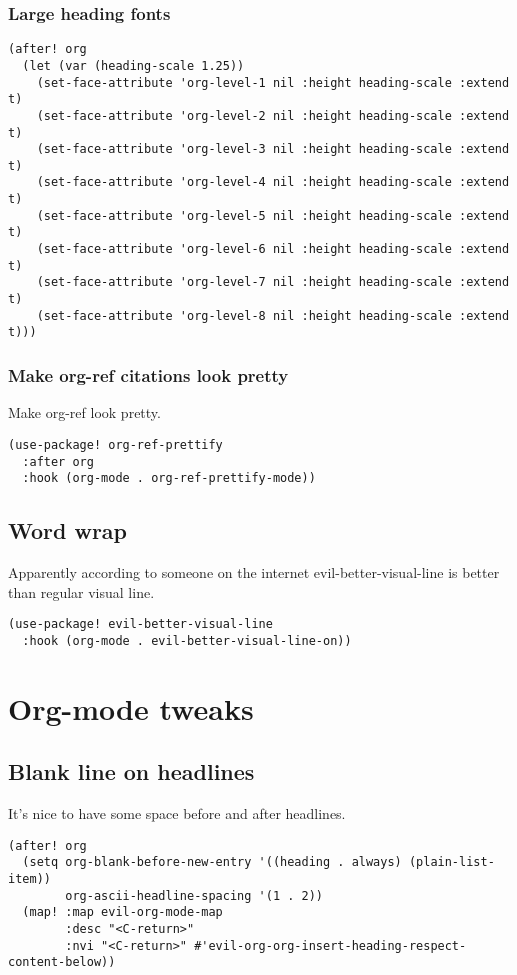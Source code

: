 \documentclass[11pt]{article}
\begin{document}
\subsubsection{Large heading fonts}
\label{sec:org16225b2}
\begin{verbatim}
(after! org
  (let (var (heading-scale 1.25))
    (set-face-attribute 'org-level-1 nil :height heading-scale :extend t)
    (set-face-attribute 'org-level-2 nil :height heading-scale :extend t)
    (set-face-attribute 'org-level-3 nil :height heading-scale :extend t)
    (set-face-attribute 'org-level-4 nil :height heading-scale :extend t)
    (set-face-attribute 'org-level-5 nil :height heading-scale :extend t)
    (set-face-attribute 'org-level-6 nil :height heading-scale :extend t)
    (set-face-attribute 'org-level-7 nil :height heading-scale :extend t)
    (set-face-attribute 'org-level-8 nil :height heading-scale :extend t)))
\end{verbatim}

\subsubsection{Make org-ref citations look pretty}
\label{sec:orge1e8389}
Make org-ref look pretty.
\begin{verbatim}
(use-package! org-ref-prettify
  :after org
  :hook (org-mode . org-ref-prettify-mode))
\end{verbatim}

\subsection{Word wrap}
\label{sec:orgcfef031}
Apparently according to someone on the internet evil-better-visual-line is better than regular visual line.
\begin{verbatim}
(use-package! evil-better-visual-line
  :hook (org-mode . evil-better-visual-line-on))
\end{verbatim}

\section{Org-mode tweaks}
\label{sec:orge4b1477}

\subsection{Blank line on headlines}
\label{sec:org8105273}
It's nice to have some space before and after headlines.
\begin{verbatim}
(after! org
  (setq org-blank-before-new-entry '((heading . always) (plain-list-item))
        org-ascii-headline-spacing '(1 . 2))
  (map! :map evil-org-mode-map
        :desc "<C-return>"
        :nvi "<C-return>" #'evil-org-org-insert-heading-respect-content-below))
\end{verbatim}
\end{document}
